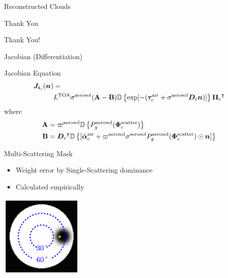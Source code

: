 \documentclass[compress,red,12pt]{beamer}
\newcommand{\vect}[1]{\bm{#1}}
\newcommand{\transpose}[1]{{#1}^\intercal}
\newcommand{\OpDiag}[1]{\mathbb{D}\left\{#1\right\}}
\begin{document}
\begin{frame}[label=current]{Reconstructed Clouds}
  \centerline{}
\end{frame}


\begin{frame}{Thank You}
  \begin{center}
    Thank You!
  \end{center}
\end{frame}


\appendix

\begin{frame}[label=jacobian]{Jacobian (Differentiation)}
  \begin{block}{Jacobian Equation}
    \begin{align*}
      {\bm J}_{{\bm i}_c}({\bm n}) &= \\
      &L^{\rm TOA}{\sigma}^{\rm
        aerosol}({\bf A}-{\bf B}) \OpDiag{\exp[-(\vect{\tau}_c^{\rm air} +
        {\sigma}^{\rm aerosol} {\bm D}_c {\bm n})]}
      \transpose{{\vect{\Pi}}_c}
    \end{align*}
    where
    \begin{align*}
      {\bf A} &= \varpi^{\rm aerosol}
      \OpDiag{ P_g^{\rm aerosol}(\vect{\Phi}^{\rm scatter}_c)} \\
      {\bf B} &= \transpose{{\bm D}_c}
      \OpDiag{[\tilde{\vect{\alpha}}^{\rm air}_c + \varpi^{\rm
          aerosol}\sigma^{\rm aerosol} P^{\rm aerosol}_g(\vect{\Phi}^{\rm
          scatter}_c) \odot{\bm n}    ]}
    \end{align*}
  \end{block}
  \hfill\hyperlink{gradient}{}
\end{frame}

\begin{frame}[label=mask]{Multi-Scattering Mask}
  \begin{itemize}
  \item Weight error by Single-Scattering dominance
  \item Calculated empirically
  \end{itemize}
  \centerline{\includegraphics[height=4cm]{images/sun_mask.pdf}}
  \hfill\hyperlink{objective<3>}{} 
\end{frame}
\end{document}
